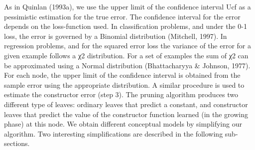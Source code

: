 As in Quinlan (1993a), we use the upper limit of the confidence
interval Ucf as a pessimistic estimation for the true error.
The confidence interval for the error depends on the loss-function used. In classification
problems, and under the 0-1 loss, the error is governed by a Binomial distribution (Mitchell,
1997). In regression problems, and for the squared error loss the variance of the error for
a given example follows a χ2 distribution. For a set of examples the sum of χ2 can be
approximated using a Normal distribution (Bhattacharyya \& Johnson, 1977). For each
node, the upper limit of the confidence interval is obtained from the sample error using
the appropriate distribution. A similar procedure is used to estimate the constructor error
(step 3).
The pruning algorithm produces two different type of leaves: ordinary leaves that predict
a constant, and constructor leaves that predict the value of the constructor function learned
(in the growing phase) at this node.
We obtain different conceptual models by simplifying our algorithm. Two interesting
simplifications are described in the following sub-sections.


